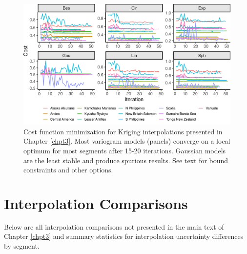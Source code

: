 \begin{figure}[htbp]

{\centering \includegraphics[width=1\linewidth,]{assets/figs/chpt3/optTrace} 

}

\caption[Cost function minimization for Kriging interpolations]{Cost function minimization for Kriging interpolations presented in Chapter \ref{chpt3}. Most variogram models (panels) converge on a local optimum for most segments after 15-20 iterations. Gaussian models are the least stable and produce spurious results. See text for bound constraints and other options.}\label{fig:optTrace}
\end{figure}

\hypertarget{interpDiffAppendix}{%
\section{Interpolation Comparisons}\label{interpDiffAppendix}}

Below are all interpolation comparisons not presented in the main text of Chapter \ref{chpt3} and summary statistics for interpolation uncertainty differences by segment.

